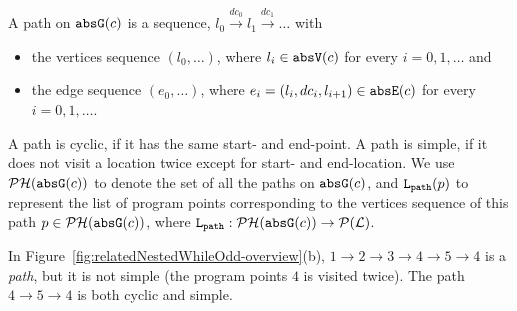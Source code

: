 \begin{defn}[Path]
  \label{def:abs_cfgpath} 
  A path on $\mathtt{abs}{\mathtt{G}}(c)$ is a sequence, $ l_0 \xrightarrow{dc_0} l_1 \xrightarrow{dc_1} \ldots $ with
  \begin{itemize}
  \item the vertices sequence $(l_0, \ldots)$, where $l_i \in \mathtt{abs}{\mathtt{V}}(c)$ for every $i = 0, 1, \ldots$ and
  \item the edge sequence $(e_0, \ldots)$, where $e_i = (l_{i}, dc_i, l_{i + 1}) \in \mathtt{abs}{\mathtt{E}}(c)$ for every $i = 0, 1, \ldots$.
  \end{itemize}
  A path is cyclic, if it has the same start- and end-point. A path is simple, if it does not visit a location twice except for start- and end-location. We use $\mathcal{PH}(\mathtt{abs}{\mathtt{G}}(c))$ to denote the set of all the paths on $\mathtt{abs}{\mathtt{G}}(c)$,
  and $\mathtt{L}_{\mathtt{path}}(p)$ to represent the list of program points corresponding to the vertices sequence of this path $p \in \mathcal{PH}(\mathtt{abs}{\mathtt{G}}(c))$,
  where $\mathtt{L}_{\mathtt{path}} : \mathcal{PH}(\mathtt{abs}{\mathtt{G}}(c)) \to \mathcal{P}{(\mathcal{L})}$.
  \end{defn}
 In Figure~\ref{fig:relatedNestedWhileOdd-overview}(b), $1 \to 2 \to 3 \to 4 \to 5 \to 4$ is a \emph{path}, but it is not simple (the program points $4$ is visited twice). The path $4 \to 5 \to 4$ is both cyclic and simple.

